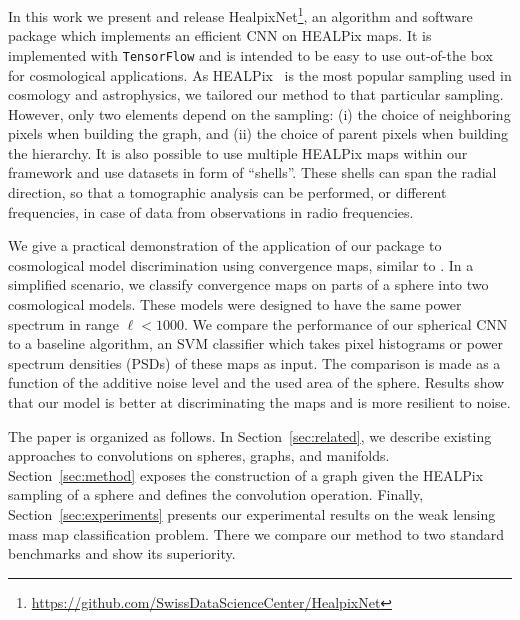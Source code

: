 \documentclass[final,twocolumn,3p,times,authoryear]{elsarticle}
\newcommand{\nati}[1]{{\color[rgb]{.1,.6,.1}{#1}}}
\newcommand{\secref}[1]{Section~\ref{sec:#1}}
\newcommand{\1}{\b{1}}              %
\newcommand{\0}{\b{0}}              %
\newcommand{\pkg}[1]{\texttt{#1}}
\begin{document}
In this work we present and release HealpixNet\footnote{\url{https://github.com/SwissDataScienceCenter/HealpixNet}}, an algorithm and software package which implements an efficient CNN on HEALPix maps. It is implemented with \pkg{TensorFlow} \citep{abadi2016tensorflow} and is intended to be easy to use out-of-the box for cosmological applications.
As HEALPix~\citep{gorski2005healpix} is the most popular sampling used in cosmology and astrophysics, we tailored our method to that particular sampling. However, only two elements depend on the sampling: (i) the choice of neighboring pixels when building the graph, and (ii) the choice of parent pixels when building the hierarchy.
It is also possible to use multiple HEALPix maps within our framework and use datasets in form of ``shells''. These shells can span the radial direction, so that a tomographic analysis can be performed, or different frequencies, in case of data from observations in radio frequencies.


We give a practical demonstration of the application of our package to cosmological model discrimination using convergence maps, similar to \citep{schmelze2017cosmologicalmodel}.
In a simplified scenario, we classify convergence maps on parts of a sphere into two cosmological models.
These models were designed to have the same power spectrum in range $\ell < 1000$.
We compare the performance of our spherical CNN to a baseline algorithm, an SVM classifier which takes pixel histograms or power spectrum densities (PSDs) of these maps as input.
The comparison is made as a function of the additive noise level and the used area of the sphere. Results show that our model is better at discriminating the maps and is more resilient to noise.

The paper is organized as follows.
In \secref{related}, we describe existing approaches to convolutions on spheres, graphs, and manifolds.
\secref{method} exposes the construction of a graph given the HEALPix sampling of a sphere and defines the convolution operation.
Finally, \secref{experiments} presents our experimental results on the weak lensing mass map classification problem. There we compare our method to two standard benchmarks and show its superiority.
\end{document}
